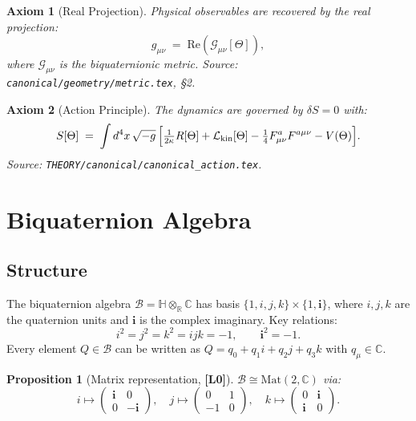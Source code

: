 \documentclass[12pt,a4paper]{article}
\newtheorem{proposition}[theorem]{Proposition}
\newtheorem{axiom}{Axiom}
\newcommand{\Lzero}{\textbf{[L0]}}
\begin{document}
\begin{axiom}[Real Projection]\label{ax:proj}
Physical observables are recovered by the real projection:
\begin{equation}
  g_{\mu\nu} \;=\; \mathrm{Re}(\mathcal{G}_{\mu\nu}[\Theta]),
\end{equation}
where $\mathcal{G}_{\mu\nu}$ is the biquaternionic metric.
\textit{Source}: \texttt{canonical/geometry/metric.tex}, \S2.
\end{axiom}

\begin{axiom}[Action Principle]\label{ax:action}
The dynamics are governed by $\delta S = 0$ with:
\begin{equation}\label{eq:S}
  S[\Theta] \;=\; \int d^4x\,\sqrt{-g}\,
  \Bigl[
    \tfrac{1}{2\kappa}R[\Theta]
    + \mathcal{L}_{\mathrm{kin}}[\Theta]
    - \tfrac{1}{4}F_{\mu\nu}^a F^{a\mu\nu}
    - V(\Theta)
  \Bigr].
\end{equation}
\textit{Source}: \texttt{THEORY/canonical/canonical\_action.tex}.
\end{axiom}

\section{Biquaternion Algebra}
\label{sec:algebra}

\subsection{Structure}

The biquaternion algebra $\mathcal{B} = \mathbb{H}\otimes_\mathbb{R}\mathbb{C}$
has basis $\{1, i, j, k\} \times \{1, \mathbf{i}\}$, where $i,j,k$ are the
quaternion units and $\mathbf{i}$ is the complex imaginary.
Key relations:
\begin{equation}
  i^2 = j^2 = k^2 = ijk = -1, \qquad \mathbf{i}^2 = -1.
\end{equation}
Every element $Q\in\mathcal{B}$ can be written as $Q = q_0 + q_1 i + q_2 j + q_3 k$
with $q_\mu \in \mathbb{C}$.

\begin{proposition}[Matrix representation, \Lzero]
$\mathcal{B} \cong \mathrm{Mat}(2,\mathbb{C})$ via:
\begin{equation}
  i \mapsto \begin{pmatrix} \mathbf{i} & 0 \\ 0 & -\mathbf{i} \end{pmatrix},\quad
  j \mapsto \begin{pmatrix} 0 & 1 \\ -1 & 0 \end{pmatrix},\quad
  k \mapsto \begin{pmatrix} 0 & \mathbf{i} \\ \mathbf{i} & 0 \end{pmatrix}.
\end{equation}
\end{proposition}
\end{document}

